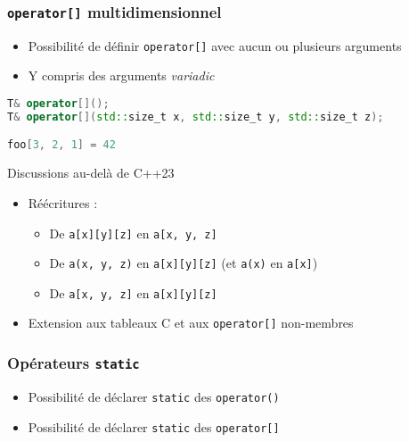 \documentclass[C++.tex]{subfiles}
\begin{document}
\begin{frame}[fragile]
	\frametitle{\lstinline|operator[]| multidimensionnel}
	\begin{itemize}
		\item Possibilité de définir \lstinline|operator[]| avec aucun ou plusieurs arguments
		\item Y compris des arguments \textit{variadic}
	\end{itemize}

	\begin{lstlisting}[language=C++]
T& operator[]();
T& operator[](std::size_t x, std::size_t y, std::size_t z);

foo[3, 2, 1] = 42\end{lstlisting}


	\begin{block}{Discussions au-delà de C++23}
		\begin{itemize}
			\item Réécritures :
			\begin{itemize}
				\item De \lstinline|a[x][y][z]| en \lstinline|a[x, y, z]|
				\item De \lstinline|a(x, y, z)| en \lstinline|a[x][y][z]| (et  \lstinline|a(x)| en \lstinline|a[x]|)
				\item De \lstinline|a[x, y, z]| en \lstinline|a[x][y][z]|
			\end{itemize}
			\item Extension aux tableaux C et aux \lstinline|operator[]| non-membres
		\end{itemize}
	\end{block}
\end{frame}

\begin{frame}[fragile]
	\frametitle{Opérateurs \lstinline|static|}
	 \begin{itemize}
	 	\item Possibilité de déclarer \lstinline|static| des \lstinline|operator()|
	 	\item Possibilité de déclarer \lstinline|static| des \lstinline|operator[]|
	 \end{itemize}
\end{frame}
\end{document}
